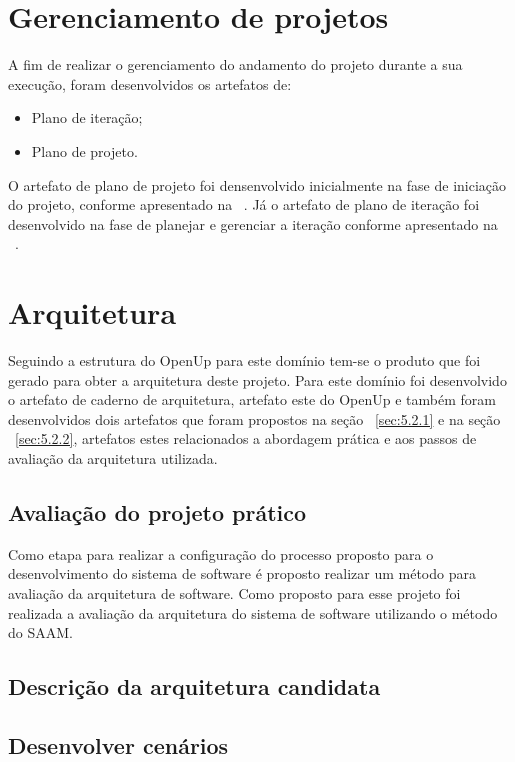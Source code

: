 \section{Gerenciamento de projetos}

A fim de realizar o gerenciamento do andamento do projeto durante a sua execução, foram desenvolvidos os artefatos de: 
\begin{itemize}
    \item Plano de iteração;
    \item Plano de projeto.
\end{itemize}

O artefato de plano de projeto foi densenvolvido inicialmente na fase de iniciação do projeto, conforme apresentado na ~. Já o artefato de plano de iteração foi desenvolvido na fase de planejar e gerenciar a iteração conforme apresentado na ~.

\section{Arquitetura}

Seguindo a estrutura do \acrfull{OpenUp} para este domínio tem-se  o produto que foi gerado para obter a arquitetura deste projeto. Para este domínio foi desenvolvido o artefato de caderno de arquitetura, artefato este do \acrfull{OpenUp} e também foram desenvolvidos dois artefatos que foram propostos na seção ~\ref{sec:5.2.1} e na seção ~\ref{sec:5.2.2}, artefatos estes relacionados a abordagem prática e aos passos de avaliação da arquitetura utilizada.

\subsection{Avaliação do projeto prático}

Como etapa para realizar a configuração do processo proposto para o desenvolvimento do sistema de software é proposto realizar um método para avaliação da arquitetura de software. Como proposto para esse projeto foi realizada a avaliação da arquitetura do sistema de software utilizando o método do \acrfull{SAAM}.

\subsection{Descrição da arquitetura candidata}

\subsection{Desenvolver cenários}

